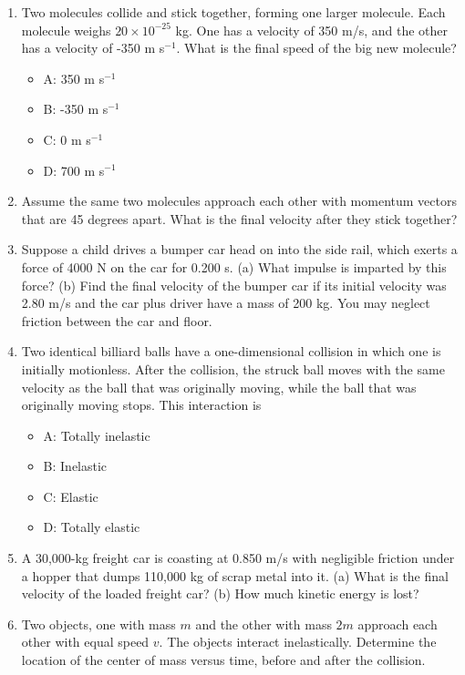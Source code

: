 \documentclass[10pt]{article}
\begin{document}
\begin{enumerate}
\item Two molecules collide and stick together, forming one larger molecule. Each molecule weighs $20 \times 10^{-25}$ kg.  One has a velocity of 350 m/s, and the other has a velocity of -350 m s$^{-1}$.  What is the final speed of the big new molecule?
\begin{itemize}
\item A: 350 m s$^{-1}$
\item B: -350 m s$^{-1}$
\item C: 0 m s$^{-1}$
\item D: 700 m s$^{-1}$
\end{itemize}
\item Assume the same two molecules approach each other with momentum vectors that are 45 degrees apart.  What is the final velocity after they stick together? \\ \vspace{3.0cm}
\item Suppose a child drives a bumper car head on into the side rail, which exerts a force of 4000 N on the car for 0.200 s. (a) What impulse is imparted by this force? (b) Find the final velocity of the bumper car if its initial velocity was 2.80 m/s and the car plus driver have a mass of 200 kg. You may neglect friction between the car and floor. \\ \vspace{3.0cm}
\item  Two identical billiard balls have a one-dimensional collision in which one is initially motionless. After the collision, the struck ball moves with the same velocity as the ball that was originally moving, while the ball that was originally moving stops.  This interaction is
\begin{itemize}
\item A: Totally inelastic
\item B: Inelastic
\item C: Elastic
\item D: Totally elastic
\end{itemize}
\item A 30,000-kg freight car is coasting at 0.850 m/s with negligible friction under a hopper that dumps 110,000 kg of scrap metal into it. (a) What is the final velocity of the loaded freight car? (b) How much kinetic energy is lost? \\ \vspace{3.0cm}
\item Two objects, one with mass $m$ and the other with mass $2m$ approach each other with equal speed $v$. The objects interact inelastically.  Determine the location of the center of mass versus time, before and after the collision. \\ \vspace{3.0cm}
\end{enumerate}
\end{document}
